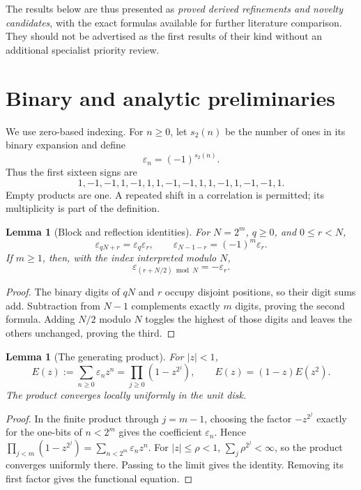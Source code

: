 \documentclass[11pt,oneside]{article}
\numberwithin{equation}{section}
\newtheorem{lemma}[theorem]{Lemma}
\theoremstyle{definition}
\theoremstyle{remark}
\newcommand{\eps}{\varepsilon}
\begin{document}
The results below are thus presented as \emph{proved derived refinements and
novelty candidates}, with the exact formulas available for further literature
comparison. They should not be advertised as the first results of their kind
without an additional specialist priority review.

\section{Binary and analytic preliminaries}
\label{sec:prelim}

We use zero-based indexing. For \(n\ge0\), let \(s_2(n)\) be the number of ones
in its binary expansion and define
\begin{equation}
 \eps_n=(-1)^{s_2(n)}.
 \label{eq:eps}
\end{equation}
Thus the first sixteen signs are
\[
 1,-1,-1,1,-1,1,1,-1,-1,1,1,-1,1,-1,-1,1.
\]
Empty products are one. A repeated shift in a correlation is permitted; its
multiplicity is part of the definition.

\begin{lemma}[Block and reflection identities]
For \(N=2^m\), \(q\ge0\), and \(0\le r<N\),
\begin{equation}
 \eps_{qN+r}=\eps_q\eps_r,
 \qquad
 \eps_{N-1-r}=(-1)^m\eps_r.
 \label{eq:blocks}
\end{equation}
If \(m\ge1\), then, with the index interpreted modulo \(N\),
\begin{equation}
 \eps_{(r+N/2)\bmod N}=-\eps_r.
 \label{eq:halfperiod}
\end{equation}
\end{lemma}
\begin{proof}
The binary digits of \(qN\) and \(r\) occupy disjoint positions, so their digit
sums add. Subtraction from \(N-1\) complements exactly \(m\) digits, proving the
second formula. Adding \(N/2\) modulo \(N\) toggles the highest of those digits
and leaves the others unchanged, proving the third.
\end{proof}

\begin{lemma}[The generating product]
For \(|z|<1\),
\begin{equation}
 E(z):=\sum_{n\ge0}\eps_nz^n
       =\prod_{j\ge0}(1-z^{2^j}),
 \qquad E(z)=(1-z)E(z^2).
 \label{eq:E}
\end{equation}
The product converges locally uniformly in the unit disk.
\end{lemma}
\begin{proof}
In the finite product through \(j=m-1\), choosing the factor \(-z^{2^j}\)
exactly for the one-bits of \(n<2^m\) gives the coefficient \(\eps_n\). Hence
\(\prod_{j<m}(1-z^{2^j})=\sum_{n<2^m}\eps_nz^n\). For \(|z|\le\rho<1\),
\(\sum_j\rho^{2^j}<\infty\), so the product converges uniformly there. Passing
to the limit gives the identity. Removing its first factor gives the functional
equation.
\end{proof}
\end{document}
